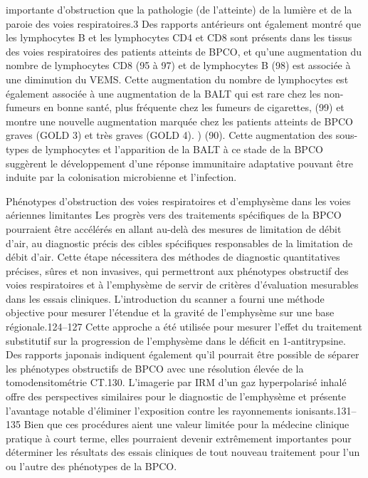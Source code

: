 \documentclass[12pt,]{article}
\begin{document}
importante d'obstruction que la pathologie (de l'atteinte) de la lumière
et de la paroie des voies respiratoires.3 Des rapports antérieurs ont
également montré que les lymphocytes B et les lymphocytes CD4 et CD8
sont présents dans les tissus des voies respiratoires des patients
atteints de BPCO, et qu'une augmentation du nombre de lymphocytes CD8
(95 à 97) et de lymphocytes B (98) est associée à une diminution du
VEMS. Cette augmentation du nombre de lymphocytes est également associée
à une augmentation de la BALT qui est rare chez les non-fumeurs en bonne
santé, plus fréquente chez les fumeurs de cigarettes, (99) et montre une
nouvelle augmentation marquée chez les patients atteints de BPCO graves
(GOLD 3) et très graves (GOLD 4). ) (90). Cette augmentation des
sous-types de lymphocytes et l'apparition de la BALT à ce stade de la
BPCO suggèrent le développement d'une réponse immunitaire adaptative
pouvant être induite par la colonisation microbienne et l'infection.

Phénotypes d'obstruction des voies respiratoires et d'emphysème dans les
voies aériennes limitantes Les progrès vers des traitements spécifiques
de la BPCO pourraient être accélérés en allant au-delà des mesures de
limitation de débit d'air, au diagnostic précis des cibles spécifiques
responsables de la limitation de débit d'air. Cette étape nécessitera
des méthodes de diagnostic quantitatives précises, sûres et non
invasives, qui permettront aux phénotypes obstructif des voies
respiratoires et à l'emphysème de servir de critères d'évaluation
mesurables dans les essais cliniques. L'introduction du scanner a fourni
une méthode objective pour mesurer l'étendue et la gravité de
l'emphysème sur une base régionale.124--127 Cette approche a été
utilisée pour mesurer l'effet du traitement substitutif sur la
progression de l'emphysème dans le déficit en 1-antitrypsine. Des
rapports japonais indiquent également qu'il pourrait être possible de
séparer les phénotypes obstructifs de BPCO avec une résolution élevée de
la tomodensitométrie CT.130. L'imagerie par IRM d'un gaz hyperpolarisé
inhalé offre des perspectives similaires pour le diagnostic de
l'emphysème et présente l'avantage notable d'éliminer l'exposition
contre les rayonnements ionisants.131--135 Bien que ces procédures aient
une valeur limitée pour la médecine clinique pratique à court terme,
elles pourraient devenir extrêmement importantes pour déterminer les
résultats des essais cliniques de tout nouveau traitement pour l'un ou
l'autre des phénotypes de la BPCO.
\end{document}
